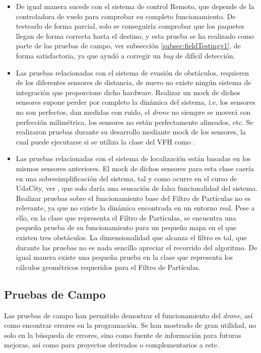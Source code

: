 \begin{itemize}
\item De igual manera sucede con el sistema de control Remoto, que depende de la controladora de vuelo para comprobar su completo funcionamiento. De testearlo de forma parcial, solo se conseguiría comprobar que los paquetes llegan de forma correcta hasta el destino, y esta prueba se ha realizado como parte de las pruebas de campo, ver subsección \ref{subsec:fieldTestingv1}, de forma satisfactoria, ya que ayudó a corregir un \emph{bug} de difícil detección.
\item Las pruebas relacionadas con el sistema de evasión de obstáculos, requieren de los diferentes sensores de distancia, de nuevo no existe ningún sistema de integración que proporcione dicho hardware. Realizar un mock de dichos sensores supone perder por completo la dinámica del sistema, i.e, los sensores no son perfectos, dan medidas con ruido, el \emph{drone} no siempre se moverá con perfección milimétrica, los sensores no están perfectamente alineados, etc. Se realizaron pruebas durante su desarrollo mediante mock de los sensores, la cual puede ejecutarse si se utiliza la clase del VFH como .
\item Las pruebas relacionadas con el sistema de localización están basadas en los mismos sensores anteriores. El mock de dichos sensores para esta clase caería en una sobresimplificación del sistema, tal y como ocurre en el curso de UdaCity, ver \citep{wiki:UdCityPF}, que solo daría una sensación de falsa funcionalidad del sistema. Realizar pruebas sobre el funcionamiento base del Filtro de Partículas no es relevante, ya que no existe la dinámica encontrada en un entorno real. Pese a ello, en la clase que representa el Filtro de Partículas, se encuentra una pequeña prueba de su funcionamiento para un pequeño mapa en el que existen tres obstáculos. La dimensionalidad que alcanza el filtro es tal, que durante las pruebas no es nada sencillo apreciar el recorrido del algoritmo. De igual manera existe una pequeña prueba en la clase que representa los cálculos geométricos requeridos para el Filtro de Partículas.
\end{itemize}


\subsection{Pruebas de Campo}

Las pruebas de campo han permitido demostrar el funcionamiento del \emph{drone}, así como encontrar errores en la programación. Se han mostrado de gran utilidad, no solo en la búsqueda de errores, sino como fuente de información para futuras mejoras, así como para proyectos derivados o complementarios a este.

